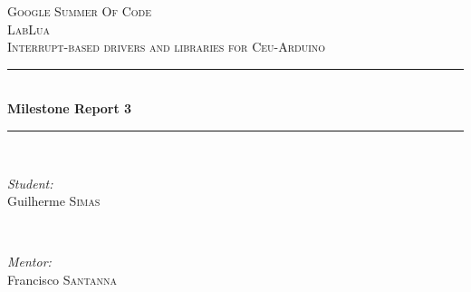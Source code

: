 \documentclass{article}
\begin{document}
\begin{titlepage}

\newcommand{\HRule}{\rule{\linewidth}{0.5mm}} %

\center %
 

\textsc{\LARGE Google Summer Of Code}\\[1.5cm] %
\textsc{\Large LabLua}\\[0.5cm] %
\textsc{\large Interrupt-based drivers and libraries for Ceu-Arduino}\\[0.5cm] %


\HRule \\[0.4cm]
{ \huge \bfseries Milestone Report 3}\\[0.4cm] %
\HRule \\[1.5cm]
 

\begin{minipage}{0.4\textwidth}
\begin{flushleft} \large
\emph{Student:}\\
Guilherme \textsc{Simas} %
\end{flushleft}
\end{minipage}
~
\begin{minipage}{0.4\textwidth}
\begin{flushright} \large
\emph{Mentor:} \\
Francisco \textsc{Santanna} %
\end{flushright}
\end{minipage}\\[4cm]



\end{titlepage}
\end{document}
